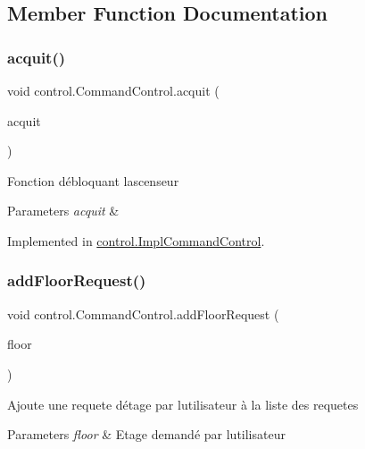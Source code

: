 \subsection{Member Function Documentation}
\mbox{\label{interfacecontrol_1_1_command_control_a7eb9b7d638a4680fdf89453ca16a6c93}} 
\subsubsection{\texorpdfstring{acquit()}{acquit()}}
{\footnotesize\ttfamily void control.\+Command\+Control.\+acquit (\begin{DoxyParamCaption}\item[{\mbox{\hyperlink{classcontrol_1_1command_1_1_acquit}{Acquit}}}]{acquit }\end{DoxyParamCaption})}

Fonction débloquant l\textquotesingle{}ascenseur 
\begin{DoxyParams}{Parameters}
{\em acquit} & \\
\hline
\end{DoxyParams}


Implemented in \mbox{\hyperlink{classcontrol_1_1_impl_command_control_a18ba4e8d7e7b6ebfec099c22f58d55d1}{control.\+Impl\+Command\+Control}}.

\mbox{\label{interfacecontrol_1_1_command_control_addb1fea724cbd015456ac62a1dcf556d}} 
\subsubsection{\texorpdfstring{addFloorRequest()}{addFloorRequest()}}
{\footnotesize\ttfamily void control.\+Command\+Control.\+add\+Floor\+Request (\begin{DoxyParamCaption}\item[{\mbox{\hyperlink{classcontrol_1_1command_1_1_floor_request}{Floor\+Request}}}]{floor }\end{DoxyParamCaption})}

Ajoute une requete d\textquotesingle{}étage par l\textquotesingle{}utilisateur à la liste des requetes 
\begin{DoxyParams}{Parameters}
{\em floor} & Etage demandé par l\textquotesingle{}utilisateur \\
\hline
\end{DoxyParams}


